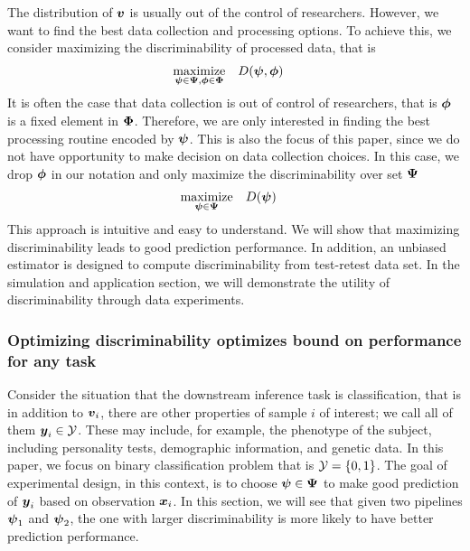 \documentclass{article}
\begin{document}
The distribution of $\boldsymbol{v}$ is usually out of the control of researchers. However, we want to find the best data collection and processing options. To achieve this, we consider maximizing the discriminability of processed data, that is  
\begin{equation} 
\begin{aligned}
& \underset{\boldsymbol{\psi} \in \boldsymbol{\Psi},\boldsymbol{\phi} \in \boldsymbol{\Phi}}{\text{maximize}}
& & D(\boldsymbol{\psi},\boldsymbol{\phi})
\end{aligned}
\end{equation}
It is often the case that data collection is out of control of researchers, that is $\boldsymbol{\phi}$ is a fixed element in $\boldsymbol{\Phi}$. Therefore, we are only interested in finding the best processing routine encoded by $\boldsymbol{\psi}$. This is also the focus of this paper, since we do not have opportunity to make decision on data collection choices. In this case, we drop $\boldsymbol{\phi}$ in our notation and only maximize the discriminability over set $\boldsymbol{\Psi}$
\begin{equation} 
\begin{aligned}
& \underset{\boldsymbol{\psi} \in \boldsymbol{\Psi}}{\text{maximize}}
& & D(\boldsymbol{\psi})
\end{aligned}
\end{equation}
This approach is intuitive and easy to understand. We will show that maximizing discriminability leads to good prediction performance. In addition, an unbiased estimator is designed to compute discriminability from test-retest data set. In the simulation and application section, we will demonstrate the utility of discriminability through data experiments.



\subsubsection{Optimizing discriminability optimizes bound on performance for any task}

Consider the situation that the downstream inference task is classification, that is in addition to $\boldsymbol{v}_i$, there are other properties of sample $i$ of interest; we call all of them $\boldsymbol{y}_i \in \mathcal{Y}$.  These may include, for example, the phenotype of the subject, including personality tests, demographic information, and genetic data. In this paper, we focus on binary classification problem that is $\mathcal{Y}=\{0,1\}$. The goal of experimental design, in this context, is to choose $\boldsymbol{\psi} \in \boldsymbol{\Psi}$ to make good prediction of $\boldsymbol{y}_i$ based on observation $\boldsymbol{x}_i$. In this section, we will see that given two pipelines $\boldsymbol{\psi}_1$ and $\boldsymbol{\psi}_2$, the one with larger discriminability is more likely to have better prediction performance.  
\end{document}

